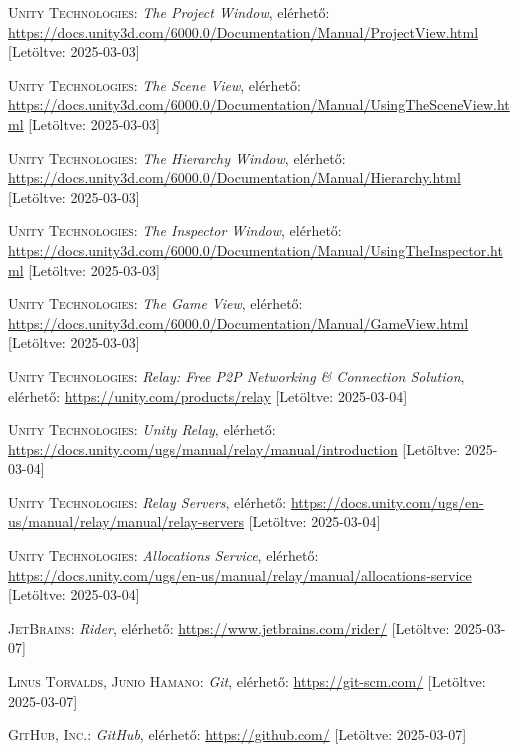 \documentclass[]{thesis-ekf}
\theoremstyle{definition}
\theoremstyle{remark}
\begin{document}
\begin{thebibliography}{2}
	\textsc{Unity Technologies}: \emph{The Project Window}, elérhető:
	\url{https://docs.unity3d.com/6000.0/Documentation/Manual/ProjectView.html} [Letöltve: 2025-03-03]
	
	\textsc{Unity Technologies}: \emph{The Scene View}, elérhető:
	\url{https://docs.unity3d.com/6000.0/Documentation/Manual/UsingTheSceneView.html} [Letöltve: 2025-03-03]
	
	\textsc{Unity Technologies}: \emph{The Hierarchy Window}, elérhető:
	\url{https://docs.unity3d.com/6000.0/Documentation/Manual/Hierarchy.html} [Letöltve: 2025-03-03]
	
	\textsc{Unity Technologies}: \emph{The Inspector Window}, elérhető:
	\url{https://docs.unity3d.com/6000.0/Documentation/Manual/UsingTheInspector.html} [Letöltve: 2025-03-03]
	
	\textsc{Unity Technologies}: \emph{The Game View}, elérhető:
	\url{https://docs.unity3d.com/6000.0/Documentation/Manual/GameView.html} [Letöltve: 2025-03-03]
	
	\textsc{Unity Technologies}: \emph{Relay: Free P2P Networking \& Connection Solution}, elérhető:
	\url{https://unity.com/products/relay} [Letöltve: 2025-03-04]
	
	\textsc{Unity Technologies}: \emph{Unity Relay}, elérhető:
	\url{https://docs.unity.com/ugs/manual/relay/manual/introduction} [Letöltve: 2025-03-04]
	
	\textsc{Unity Technologies}: \emph{Relay Servers}, elérhető:
	\url{https://docs.unity.com/ugs/en-us/manual/relay/manual/relay-servers} [Letöltve: 2025-03-04]
	
	\textsc{Unity Technologies}: \emph{Allocations Service}, elérhető:
	\url{https://docs.unity.com/ugs/en-us/manual/relay/manual/allocations-service} [Letöltve: 2025-03-04]
	
	\textsc{JetBrains}: \emph{Rider}, elérhető:
	\url{https://www.jetbrains.com/rider/} [Letöltve: 2025-03-07]
	
	\textsc{Linus Torvalds, Junio Hamano}: \emph{Git}, elérhető:
	\url{https://git-scm.com/} [Letöltve: 2025-03-07]
	
	\textsc{GitHub, Inc.}: \emph{GitHub}, elérhető:
	\url{https://github.com/} [Letöltve: 2025-03-07]
	

\end{thebibliography}
\end{document}
